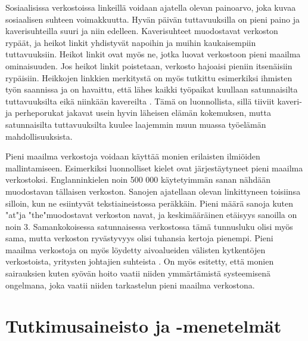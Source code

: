 \documentclass[finnish,12pt,a4paper,pdftex,elec,utf8]{aaltothesis}
\begin{document}
Sosiaalisissa verkostoissa linkeillä voidaan ajatella olevan painoarvo, joka kuvaa sosiaalisen suhteen voimakkuutta. Hyvän päivän tuttavuuksilla on pieni paino ja kaverisuhteilla suuri ja niin edelleen. Kaverisuhteet muodostavat verkoston rypäät, ja heikot linkit yhdistyvät napoihin ja muihin kaukaisempiin tuttavuuksiin. Heikot linkit ovat myös ne, jotka luovat verkostoon pieni maailma ominaisuuden. Jos heikot linkit poistetaan, verkosto hajoaisi pieniin itsenäisiin rypäisiin. \cite[55]{Nexus} Heikkojen linkkien merkitystä on myös tutkittu esimerkiksi ihmisten työn saannissa ja on havaittu, että lähes kaikki työpaikat kuullaan satunnaisilta tuttavuuksilta eikä niinkään kavereilta \cite{Linkit}. Tämä on luonnollista, sillä tiiviit kaveri- ja perheporukat jakavat usein hyvin läheisen elämän kokemuksen, mutta satunnaisilta tuttavuuksilta kuulee laajemmin muun muassa työelämän mahdollisuuksista. \cite{Linkit}

Pieni maailma verkostoja voidaan käyttää monien erilaisten ilmiöiden mallintamiseen. Esimerkiksi luonnolliset kielet ovat järjestäytyneet pieni maailma verkostoksi. Englanninkielen noin 500 000 käytetyimmän sanan nähdään muodostavan tällaisen verkoston. Sanojen ajatellaan olevan linkittyneen toisiinsa silloin, kun ne esiintyvät tekstiaineistossa peräkkäin. Pieni määrä sanoja kuten "at"\space ja "the"\space muodostavat verkoston navat, ja keskimääräinen etäisyys sanoilla on noin 3. Samankokoisessa satunnaisessa verkostossa tämä tunnusluku olisi myös sama, mutta verkoston ryvästyvyys olisi tuhansia kertoja pienempi. \cite[88]{Nexus} Pieni maailma verkostoja on myös löydetty aivoalueiden välisten kytkentöjen verkostoista, \cite[65]{Nexus} yritysten johtajien suhteista \cite[119]{Nexus}. On myös esitetty, että monien sairauksien kuten syövän \cite{p53-network} hoito vaatii niiden ymmärtämistä systeemisenä ongelmana, joka vaatii niiden tarkastelun pieni maailma verkostona.



\clearpage
\section{Tutkimusaineisto ja -menetelmät}
\end{document}
